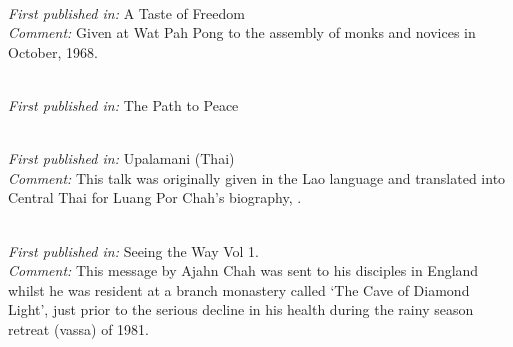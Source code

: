 { \\
\textit{First published in:} A Taste of Freedom \\
\textit{Comment:} Given at Wat Pah Pong to the assembly of monks and novices in October, 1968.

\clearpage

 \\
\textit{First published in:} The Path to Peace

 \\
\textit{First published in:} Upalamani (Thai) \\
\textit{Comment:} This talk was originally given in the Lao language and translated into Central Thai for Luang Por Chah's biography, .

 \\
\textit{First published in:} Seeing the Way Vol 1. \\
\textit{Comment:} This message by Ajahn Chah was sent to his disciples in England whilst he was resident at a branch monastery called `The Cave of Diamond Light', just prior to the serious decline in his health during the rainy season retreat (vassa) of 1981.

}

